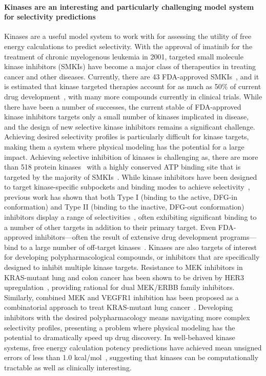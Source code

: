 \documentclass[9pt,lineno]{elife-modified} %
\begin{document}
\paragraph{Kinases are an interesting and particularly challenging model system for selectivity predictions}
Kinases are a useful model system to work with for assessing the utility of free energy calculations to predict selectivity. With the approval of imatinib for the treatment of chronic myelogenous leukemia in 2001, targeted small molecule kinase inhibitors (SMKIs) have become a major class of therapeutics in treating cancer and other diseases. 
Currently, there are 43 FDA-approved SMKIs~\citep{fda-approved-kinase-inhibitors}, and it is estimated that kinase targeted therapies account for as much as 50\% of current drug development~\citep{Santos:Nat.Rev.DrugDiscov.:2016}, with many more compounds currently in clinical trials. 
While there have been a number of successes, the current stable of FDA-approved kinase inhibitors targets only a small number of kinases implicated in disease, and the design of new selective kinase inhibitors remains a significant challenge.
Achieving desired selectivity profiles is particularly difficult for kinase targets, making them a system where physical modeling has the potential for a large impact. Achieving selective inhibition of kinases is challenging as, there are more than 518 protein kinases~\citep{Volkamer2015-jx,Manning2002-cw} with a highly conserved ATP binding site that is targeted by the majority of SMKIs~\citep{Wu2015-oq}.
While kinase inhibitors have been designed to target kinase-specific subpockets and binding modes to achieve selectivity~\citep{Cowan-Jacob2007-rn,Seeliger2007-jn,Huse2002-ml,Harrison2003-ct,Volkamer2016-sj,ChristmannFranck:2016gka}, previous work has shown that both Type I (binding to the active, DFG-in conformation) and Type II (binding to the inactive, DFG-out conformation) inhibitors display a range of selectivities~\citep{Anastassiadis2011-sm,Davis:Nat.Biotechnol.:2011}, often exhibiting significant binding to a number of other targets in addition to their primary target. 
Even FDA-approved inhibitors---often the result of extensive drug development programs---bind to a large number of off-target kinases~\citep{Klaeger2017-jr}. Kinases are also targets of interest for developing polypharmacological compounds, or inhibitors that are specifically designed to inhibit multiple kinase targets. Resistance to MEK inhibitors in KRAS-mutant lung and colon cancer has been shown to be driven by HER3 upregulation~\citep{Sun:2014kt}, providing rational for dual MEK/ERBB family inhibitors. Similarly, combined MEK and VEGFR1 inhibition has been proposed as a combinatorial approach to treat KRAS-mutant lung cancer~\citep{Manchado:2016fb}. Developing inhibitors with the desired polypharmacology means navigating more complex selectivity profiles, presenting a problem where physical modeling has the potential to dramatically speed up drug discovery. In well-behaved kinase systems, free energy calculation potency predictions have achieved mean unsigned errors of less than 1.0 kcal/mol~\citep{Wang:J.Am.Chem.Soc.:2015,Abel2017-gw}, suggesting that kinases can be computationally tractable as well as clinically interesting. 
\end{document}

